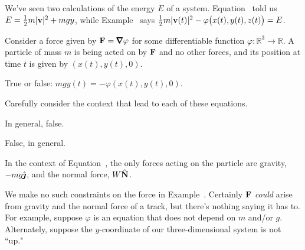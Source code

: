 

\subsection*{\Conceptual}

\begin{question}
We've seen two calculations of the energy $E$ of a system. Equation~ told us
$E=\frac{1}{2}m|\mathbf{v}|^2+mgy$, while Example~ says $\frac{1}{2} m |\mathbf{v}(t)|^2 -\varphi\big(x(t),y(t),z(t)\big)=E$.

Consider a force given by $\vF = \vnabla \varphi$ for some differentiable function $\varphi:\mathbb R^3 \to \mathbb R$. A particle of mass $m$ is being acted on by $\mathbf{F}$ and no other forces, and its position at time $t$ is given by $(x(t),y(t),0)$.

True or false: $mgy(t)=-\varphi(x(t),y(t),0)$.
\end{question}
\begin{hint}
Carefully consider the context that lead to each of these equations.
\end{hint}
\begin{answer}
In general, false.
\end{answer}
\begin{solution}
False, in general.

In the context of Equation~, the only forces acting on the particle are gravity, $-mg\hat{\pmb{\jmath}}$, and the normal force, $W\hat{\mathbf{N}}$.

We make no such constraints on the force in Example~. Certainly $\mathbf{F}$ \emph{could} arise from gravity and the normal force of a track, but there's nothing saying it has to. For example, suppose $\varphi$ is an equation that does not depend on $m$ and/or $g$. Alternately, suppose the $y$-coordinate of our three-dimensional system is not ``up."
\end{solution}


